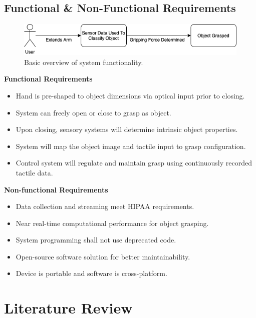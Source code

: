 \documentclass[11.5pt]{article}
\begin{document}
\subsection{Functional \& Non-Functional Requirements}

\begin{figure}[H]
    \centering
    \includegraphics[width=0.8\linewidth]{Circuits/funreq.png}
    \caption{Basic overview of system functionality.}
    \label{fig:funreq}
\end{figure}

\textbf{Functional Requirements}

\begin{itemize}
    \item Hand is pre-shaped to object dimensions via optical input prior to closing.
    \item System can freely open or close to grasp as object.
    \item Upon closing, sensory systems will determine intrinsic object properties.
    \item System will map the object image and tactile input to grasp configuration.
    \item Control system will regulate and maintain grasp using continuously recorded tactile data.
\end{itemize}

\textbf{Non-functional Requirements}

\begin{itemize}
    \item Data collection and streaming meet HIPAA requirements.
    \item Near real-time computational performance for object grasping.
    \item System programming shall not use deprecated code.
    \item Open-source software solution for better maintainability.
    \item Device is portable and software is cross-platform.
\end{itemize}

\newpage
\section{Literature Review}
\end{document}
